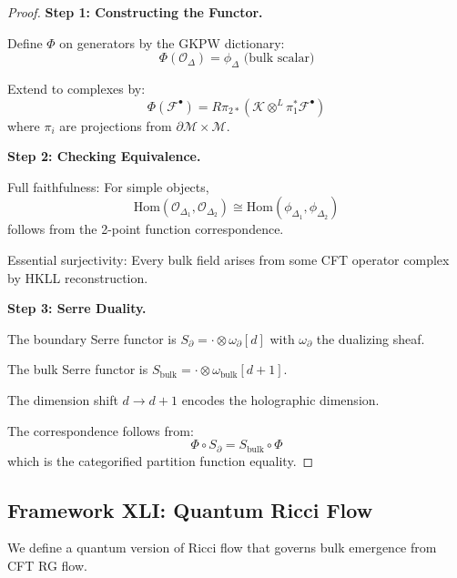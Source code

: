 \documentclass[12pt,a4paper]{article}
\begin{document}
\begin{proof}
\textbf{Step 1: Constructing the Functor.}

Define $\Phi$ on generators by the GKPW dictionary:
\begin{equation}
\Phi(\mathcal{O}_\Delta) = \phi_\Delta \text{ (bulk scalar)}
\end{equation}

Extend to complexes by:
\begin{equation}
\Phi(\mathcal{F}^\bullet) = R\pi_{2*}(\mathcal{K} \otimes^L \pi_1^* \mathcal{F}^\bullet)
\end{equation}
where $\pi_i$ are projections from $\partial\mathcal{M} \times \mathcal{M}$.

\textbf{Step 2: Checking Equivalence.}

Full faithfulness: For simple objects,
\begin{equation}
\text{Hom}(\mathcal{O}_{\Delta_1}, \mathcal{O}_{\Delta_2}) \cong \text{Hom}(\phi_{\Delta_1}, \phi_{\Delta_2})
\end{equation}
follows from the 2-point function correspondence.

Essential surjectivity: Every bulk field arises from some CFT operator complex by HKLL reconstruction.

\textbf{Step 3: Serre Duality.}

The boundary Serre functor is $S_{\partial} = \cdot \otimes \omega_{\partial}[d]$ with $\omega_\partial$ the dualizing sheaf.

The bulk Serre functor is $S_{\text{bulk}} = \cdot \otimes \omega_{\text{bulk}}[d+1]$.

The dimension shift $d \to d+1$ encodes the holographic dimension.

The correspondence follows from:
\begin{equation}
\Phi \circ S_\partial = S_{\text{bulk}} \circ \Phi
\end{equation}
which is the categorified partition function equality.
\end{proof}

\subsection{Framework XLI: Quantum Ricci Flow}

We define a quantum version of Ricci flow that governs bulk emergence from CFT RG flow.
\end{document}
